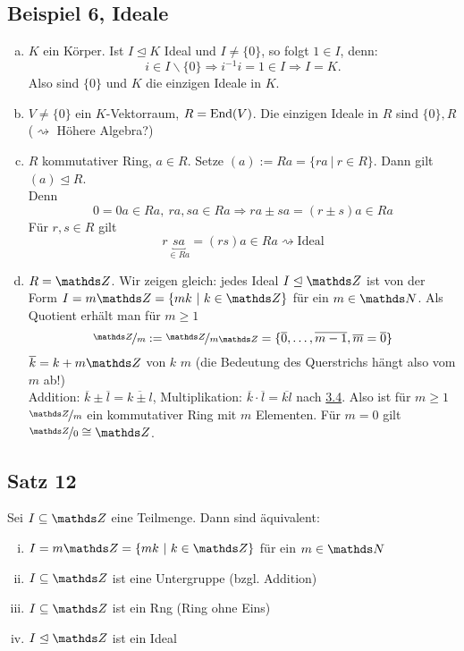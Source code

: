 \subsection{Beispiel 6, Ideale}
\label{sub:bsp_ideale}
\begin{enumerate}[(a)]
	\item $K$ ein Körper. Ist $I\trianglelefteq K$ Ideal und $I\neq \{0\}$, so folgt $1\in I$, denn:
	\[
	i\in I\backslash\{0\}\Rightarrow i^{-1}i=1\in I \Rightarrow I=K.
	\]
	Also sind $\{0\}$ und $K$ die einzigen Ideale in $K$.
	\item $V\neq \{0\}$ ein $K$-Vektorraum, $R=\operatorname{End}(V)$. 
	Die einzigen Ideale in $R$ sind $\{0\},R$ ($\rightsquigarrow$ Höhere Algebra?)
	\item $R$ kommutativer Ring, $a\in R$. 
	Setze $(a):=Ra=\{ra~|~r\in R\}$. 
	Dann gilt $(a)\trianglelefteq R$. \\%
	Denn 
	\[
	0=0a\in Ra,~ra,sa\in Ra\Rightarrow ra\pm sa=(r\pm s)a\in Ra
	\]
	Für $r,s\in R$ gilt
	\[
	r\underbracket{sa}_{\in Ra}=(rs)a\in Ra \rightsquigarrow \text{Ideal}
	\]
	\item $R=\Z$. Wir zeigen gleich: jedes Ideal $I\trianglelefteq \Z$ ist von der Form $I=m\Z=\{mk~|~k\in \Z\}$ für ein $m\in \N$. Als Quotient erhält man für $m\ge 1$
	\[
	\nicefrac{\Z}{m}:=\nicefrac{\Z}{m\Z}=\{\overline{0},\dots,\overline{m-1},\overline{m}=\overline{0} \}
	\]
	$\overline{k}=k+m\Z$  von $k$  $m$ (die Bedeutung des Querstrichs hängt also vom $m$ ab!)\\
	Addition: $\overline{k}\pm\overline{l}=\overline{k\pm l}$, Multiplikation: $\overline{k}\cdot\overline{l}=\overline{kl}$ nach \hyperref[sub:homomor_ideale]{3.4}. 
	Also ist für $m\ge 1$ $\nicefrac{\Z}{m}$ ein kommutativer Ring mit $m$ Elementen.
	Für $m=0$ gilt $\nicefrac{\Z}{0}\cong \Z$.
\end{enumerate}


\subsection{Satz 12}
\label{sub:satz_12}
Sei $I\subseteq \Z$ eine Teilmenge. Dann sind äquivalent:
\begin{enumerate}[(i)]
	\item $I=m\Z=\{mk~|~k\in\Z\}$ für ein $m\in \N$
	\item $I\subseteq \Z$ ist eine Untergruppe (bzgl. Addition)
	\item $I\subseteq \Z$ ist ein Rng (Ring ohne Eins)
	\item $I\trianglelefteq \Z$ ist ein Ideal
\end{enumerate}

